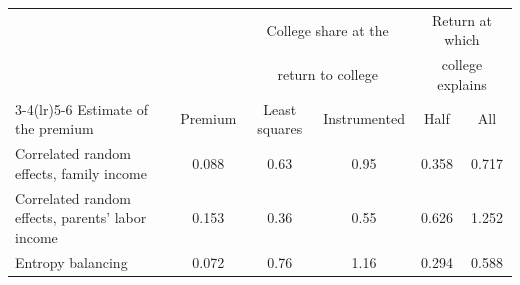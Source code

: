 \begin{tabular}{@{}p{5.4cm}ccccc@{}}
\toprule
 & & \multicolumn{2}{c}{College share at the} & \multicolumn{2}{c}{Return at which} \\
 & & \multicolumn{2}{c}{return to college} & \multicolumn{2}{c}{college explains} \\
\cmidrule(lr){3-4}\cmidrule(lr){5-6}
Estimate of the premium & Premium & Least squares & Instrumented & Half & All \\
\midrule
Correlated random effects, family income & 0.088 & 0.63 & 0.95 & 0.358 & 0.717 \\
Correlated random effects, parents' labor income & 0.153 & 0.36 & 0.55 & 0.626 & 1.252 \\
Entropy balancing & 0.072 & 0.76 & 1.16 & 0.294 & 0.588 \\
\bottomrule
\end{tabular}
